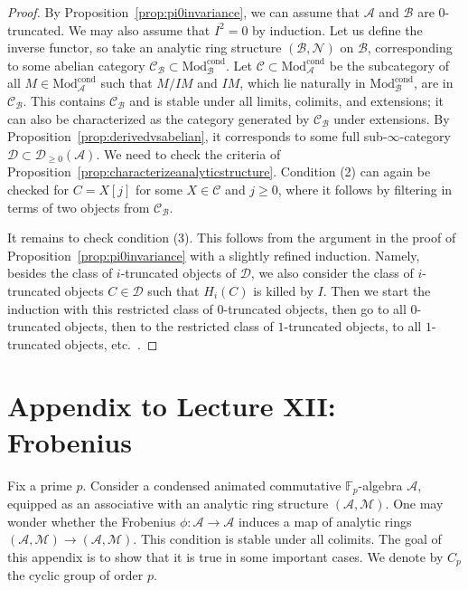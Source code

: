 \documentclass[11pt]{amsbook}
\newcommand{\CondMod}{\mathrm{Mod}^{\mathrm{cond}}}
\numberwithin{equation}{section}
\numberwithin{theorem}{section}
\theoremstyle{definition}
\begin{document}
\begin{proof} By Proposition~\ref{prop:pi0invariance}, we can assume that $\mathcal A$ and $\mathcal B$ are $0$-truncated. We may also assume that $I^2=0$ by induction. Let us define the inverse functor, so take an analytic ring structure $(\mathcal B,\mathcal N)$ on $\mathcal B$, corresponding to some abelian category $\mathcal C_{\mathcal B}\subset \CondMod_{\mathcal B}$. Let $\mathcal C\subset \CondMod_{\mathcal A}$ be the subcategory of all $M\in \CondMod_{\mathcal A}$ such that $M/IM$ and $IM$, which lie naturally in $\CondMod_{\mathcal B}$, are in $\mathcal C_{\mathcal B}$. This contains $\mathcal C_{\mathcal B}$ and is stable under all limits, colimits, and extensions; it can also be characterized as the category generated by $\mathcal C_{\mathcal B}$ under extensions. By Proposition~\ref{prop:derivedvsabelian}, it corresponds to some full sub-$\infty$-category $\mathcal D\subset \mathcal D_{\geq 0}(\mathcal A)$. We need to check the criteria of Proposition~\ref{prop:characterizeanalyticstructure}. Condition (2) can again be checked for $C=X[j]$ for some $X\in \mathcal C$ and $j\geq 0$, where it follows by filtering in terms of two objects from $\mathcal C_{\mathcal B}$.

It remains to check condition (3). This follows from the argument in the proof of Proposition~\ref{prop:pi0invariance} with a slightly refined induction. Namely, besides the class of $i$-truncated objects of $\mathcal D$, we also consider the class of $i$-truncated objects $C\in \mathcal D$ such that $H_i(C)$ is killed by $I$. Then we start the induction with this restricted class of $0$-truncated objects, then go to all $0$-truncated objects, then to the restricted class of $1$-truncated objects, to all $1$-truncated objects, etc.~.
\end{proof}

\newpage

\section*{Appendix to Lecture XII: Frobenius}

Fix a prime $p$. Consider a condensed animated commutative $\mathbb F_p$-algebra $\mathcal A$, equipped as an associative with an analytic ring structure $(\mathcal A,\mathcal M)$. One may wonder whether the Frobenius $\phi: \mathcal A\to \mathcal A$ induces a map of analytic rings $(\mathcal A,\mathcal M)\to (\mathcal A,\mathcal M)$. This condition is stable under all colimits. The goal of this appendix is to show that it is true in some important cases. We denote by $C_p$ the cyclic group of order $p$.
\end{document}
